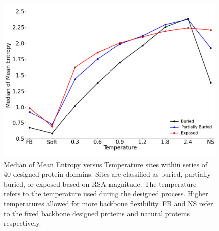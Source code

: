 \documentclass[12pt]{article}
\begin{document}
\begin{figure}[H]
\centerline{\includegraphics[width = 6in]{figures/Mean_Entropy_Position_Lineplot_Noah.png}}
\caption{Median of Mean Entropy versus Temperature sites within series of 40 designed protein domains.  Sites are classified as buried, partially buried, or exposed based on RSA magnitude. The temperature refers to the temperature used during the designed process. Higher temperatures allowed for more backbone flexibility. FB and NS refer to the fixed backbone designed proteins and natural proteins respectively.}
\label{Postion_Entropy_Noah}
\end{figure}
\end{document}
